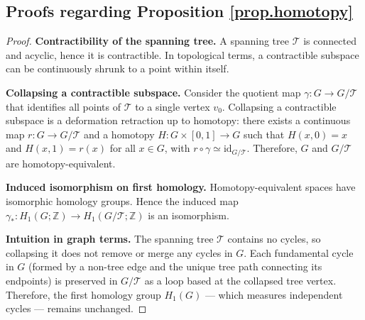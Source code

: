 \subsection{Proofs regarding Proposition \ref{prop.homotopy}}
\label{app.proof.homotopy}
\begin{proof}
\textbf{Contractibility of the spanning tree.}  
A spanning tree $\mathcal{T}$ is connected and acyclic, hence it is contractible. 
In topological terms, a contractible subspace can be continuously shrunk to a point within itself.

\textbf{Collapsing a contractible subspace.}  
Consider the quotient map $\gamma: G \to G/\mathcal{T}$ that identifies all points of $\mathcal{T}$ to a single vertex $v_0$.  
Collapsing a contractible subspace is a deformation retraction up to homotopy: there exists a continuous map 
$r: G \to G/\mathcal{T}$ and a homotopy 
$H: G \times [0,1] \to G$ such that $H(x,0) = x$ and $H(x,1) = r(x)$ for all $x \in G$, with $r \circ \gamma \simeq \mathrm{id}_{G/\mathcal{T}}$.  
Therefore, $G$ and $G/\mathcal{T}$ are homotopy-equivalent.

\textbf{Induced isomorphism on first homology.}  
Homotopy-equivalent spaces have isomorphic homology groups.  
Hence the induced map 
$\gamma_*: H_1(G;\mathbb{Z}) \to H_1(G/\mathcal{T};\mathbb{Z})$ 
is an isomorphism.

\textbf{Intuition in graph terms.}  
The spanning tree $\mathcal{T}$ contains no cycles, so collapsing it does not remove or merge any cycles in $G$.  
Each fundamental cycle in $G$ (formed by a non-tree edge and the unique tree path connecting its endpoints) is preserved in $G/\mathcal{T}$ as a loop based at the collapsed tree vertex.  
Therefore, the first homology group $H_1(G)$ — which measures independent cycles — remains unchanged.
\end{proof}

